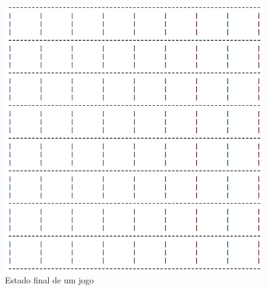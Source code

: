 \documentclass[a4paper,11pt,titlepage]{article}
\begin{document}
\begin{figure}[H]
    \center
    \includegraphics[scale=0.45]{res/9-final-state.png}
    \caption{Estado final de um jogo}
    \label{fig:9-final-state.png}
\end{figure}
\end{document}
